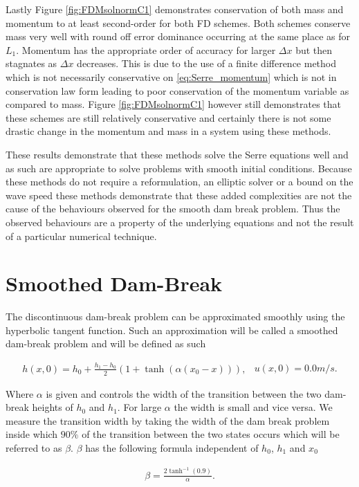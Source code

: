 \documentclass[SingleSpace,12pt,Journal]{Serre_ASCE}
\begin{document}
Lastly Figure \ref{fig:FDMsolnormC1} demonstrates conservation of both mass and momentum to at least second-order for both FD schemes. Both schemes conserve mass very well with round off error dominance occurring at the same place as for $L_1$. Momentum has the appropriate order of accuracy for larger $\Delta x$ but then stagnates as $\Delta x$ decreases. This is due to the use of a finite difference method which is not necessarily conservative on \eqref{eq:Serre_momentum} which is not in conservation law form leading to poor conservation of the momentum variable as compared to mass. Figure \ref{fig:FDMsolnormC1} however still demonstrates that these schemes are still relatively conservative and certainly there is not some drastic change in the momentum and mass in a system using these methods. 

These results demonstrate that these methods solve the Serre equations well and as such are appropriate to solve problems with smooth initial conditions. Because these methods do not require a reformulation, an elliptic solver or a bound on the wave speed these methods demonstrate that these added complexities are not the cause of the behaviours observed for the smooth dam break problem. Thus the observed behaviours are a property of the underlying equations and not the result of a particular numerical technique. 

\section{Smoothed Dam-Break}
\label{section:smootheddambreak}
The discontinuous dam-break problem can be approximated smoothly using the hyperbolic tangent function. Such an approximation will be called a smoothed dam-break problem and will be defined as such
\begin{linenomath*}
\begin{subequations}
\begin{gather}
h(x,0) = h_0 + \frac{h_1 - h_0}{2}\left(1 + \tanh\left(\alpha\left(x_0 - x\right)\right)\right),
\end{gather}
\begin{gather}
u(x,0) = 0.0m/s.
\end{gather}
\end{subequations}
\label{eq:sdbi}
\end{linenomath*}
Where $\alpha$ is given and controls the width of the transition between the two dam-break heights of $h_0$ and $h_1$. For large $\alpha$ the width is small and vice versa. We measure the transition width by taking the width of the dam break problem inside which $90 \%$ of the transition between the two states occurs which will be referred to as $\beta$. $\beta$ has the following formula independent of $h_0$, $h_1$ and $x_0$
\begin{linenomath*}
\begin{gather}
\beta = \frac{2 \tanh^{-1}\left(0.9\right)}{\alpha}.
\end{gather}
\label{eq:sdbtrans}
\end{linenomath*}
\end{document}
